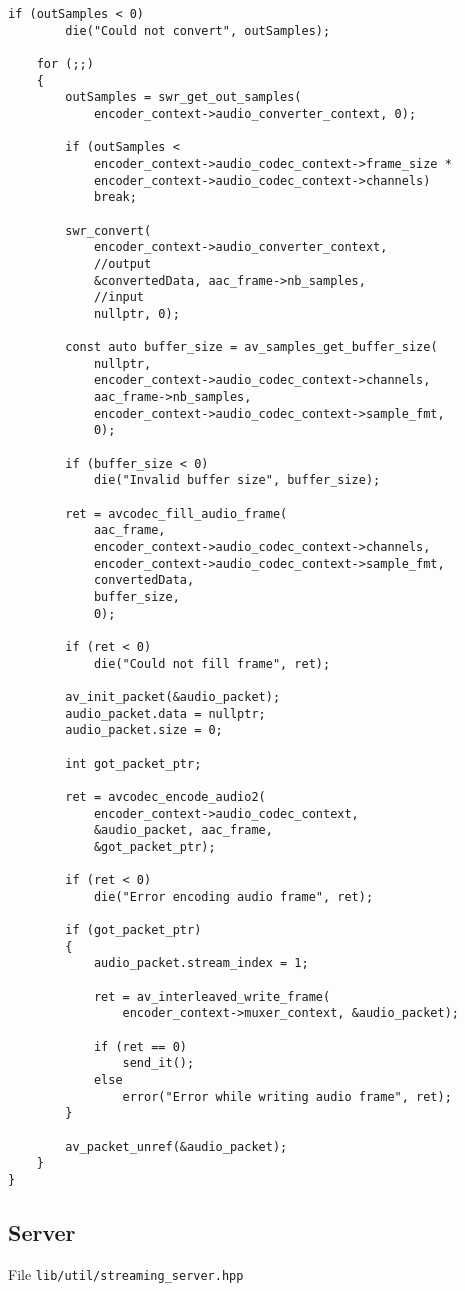 \begin{lstlisting}[label={lst:encode_to_movie}]
	if (outSamples < 0)
		die("Could not convert", outSamples);

	for (;;)
	{
		outSamples = swr_get_out_samples(
			encoder_context->audio_converter_context, 0);

		if (outSamples < 
			encoder_context->audio_codec_context->frame_size * 
			encoder_context->audio_codec_context->channels)
			break;

		swr_convert(
			encoder_context->audio_converter_context,
			//output
			&convertedData, aac_frame->nb_samples,
			//input
			nullptr, 0);

		const auto buffer_size = av_samples_get_buffer_size(
			nullptr,
			encoder_context->audio_codec_context->channels,
			aac_frame->nb_samples,
			encoder_context->audio_codec_context->sample_fmt,
			0);

		if (buffer_size < 0)
			die("Invalid buffer size", buffer_size);

		ret = avcodec_fill_audio_frame(
			aac_frame,
			encoder_context->audio_codec_context->channels,
			encoder_context->audio_codec_context->sample_fmt,
			convertedData,
			buffer_size,
			0);

		if (ret < 0)
			die("Could not fill frame", ret);

		av_init_packet(&audio_packet);
		audio_packet.data = nullptr;
		audio_packet.size = 0;

		int got_packet_ptr;

		ret = avcodec_encode_audio2(
			encoder_context->audio_codec_context, 
			&audio_packet, aac_frame, 
			&got_packet_ptr);

		if (ret < 0)
			die("Error encoding audio frame", ret);

		if (got_packet_ptr)
		{
			audio_packet.stream_index = 1;

			ret = av_interleaved_write_frame(
				encoder_context->muxer_context, &audio_packet);

			if (ret == 0)
				send_it();
			else
				error("Error while writing audio frame", ret);
		}

		av_packet_unref(&audio_packet);
	}
}
\end{lstlisting}


\newpage
\subsection{Server}
File \verb|lib/util/streaming_server.hpp|

